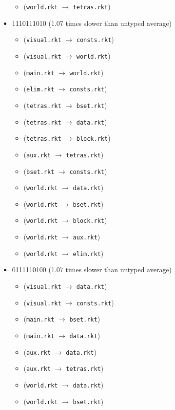 \documentclass{article}
\newcommand{\mono}[1]{\texttt{#1}}
\begin{document}
\begin{itemize}
\begin{itemize}
  \item (\mono{world.rkt} $\rightarrow$ \mono{tetras.rkt})
  \end{itemize}
\item 1110111010 (1.07 times slower than untyped average)
  \begin{itemize}
  \item (\mono{visual.rkt} $\rightarrow$ \mono{consts.rkt})
  \item (\mono{visual.rkt} $\rightarrow$ \mono{world.rkt})
  \item (\mono{main.rkt} $\rightarrow$ \mono{world.rkt})
  \item (\mono{elim.rkt} $\rightarrow$ \mono{consts.rkt})
  \item (\mono{tetras.rkt} $\rightarrow$ \mono{bset.rkt})
  \item (\mono{tetras.rkt} $\rightarrow$ \mono{data.rkt})
  \item (\mono{tetras.rkt} $\rightarrow$ \mono{block.rkt})
  \item (\mono{aux.rkt} $\rightarrow$ \mono{tetras.rkt})
  \item (\mono{bset.rkt} $\rightarrow$ \mono{consts.rkt})
  \item (\mono{world.rkt} $\rightarrow$ \mono{data.rkt})
  \item (\mono{world.rkt} $\rightarrow$ \mono{bset.rkt})
  \item (\mono{world.rkt} $\rightarrow$ \mono{block.rkt})
  \item (\mono{world.rkt} $\rightarrow$ \mono{aux.rkt})
  \item (\mono{world.rkt} $\rightarrow$ \mono{elim.rkt})
  \end{itemize}
\item 0111110100 (1.07 times slower than untyped average)
  \begin{itemize}
  \item (\mono{visual.rkt} $\rightarrow$ \mono{data.rkt})
  \item (\mono{visual.rkt} $\rightarrow$ \mono{consts.rkt})
  \item (\mono{main.rkt} $\rightarrow$ \mono{bset.rkt})
  \item (\mono{main.rkt} $\rightarrow$ \mono{data.rkt})
  \item (\mono{aux.rkt} $\rightarrow$ \mono{data.rkt})
  \item (\mono{aux.rkt} $\rightarrow$ \mono{tetras.rkt})
  \item (\mono{world.rkt} $\rightarrow$ \mono{data.rkt})
  \item (\mono{world.rkt} $\rightarrow$ \mono{bset.rkt})

\end{itemize}
\end{itemize}
\end{document}
